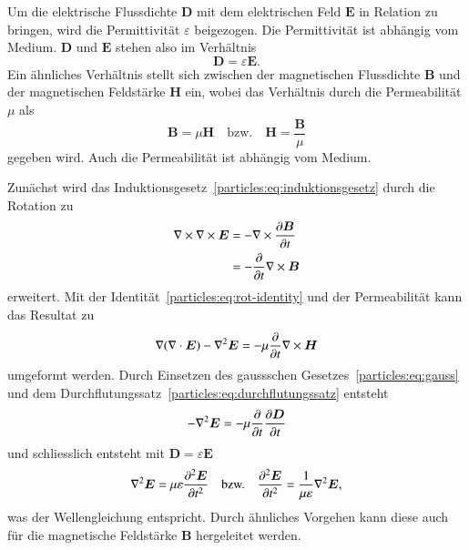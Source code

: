 Um die elektrische Flussdichte $\boldsymbol{D}$ mit dem elektrischen Feld $\boldsymbol{E}$ in Relation zu bringen, 
%
%
%
wird die Permittivität $\varepsilon$ beigezogen.
%
Die Permittivität ist abhängig vom Medium. 
$\boldsymbol{D}$ und $\boldsymbol{E}$ stehen also im Verhältnis
\begin{equation}
    \boldsymbol{D} = \varepsilon \boldsymbol{E}.
    \label{particles:eq:de}
\end{equation}
Ein ähnliches Verhältnis stellt sich zwischen der magnetischen Flussdichte $\boldsymbol{B}$ und der magnetischen Feldstärke $\boldsymbol{H}$ ein, wobei das Verhältnis durch die Permeabilität $\mu$ als
%
%
%
%
%
\begin{equation}
    \boldsymbol{B} = \mu \boldsymbol{H} \quad \text{bzw.} \quad \boldsymbol{H} = \frac{\boldsymbol{B}}{\mu}
    \label{particles:eq:bh}
\end{equation}
gegeben wird.
Auch die Permeabilität ist abhängig vom Medium.

Zunächst wird das Induktionsgesetz~\eqref{particles:eq:induktionsgesetz} durch die Rotation zu
\begin{align}
    \nabla \times \nabla \times \boldsymbol{E} 
        &= - \nabla \times \frac{\d\boldsymbol{B}}{\d t} \\
        &= - \frac{\d}{\d t} \nabla \times \boldsymbol{B}
\end{align}
erweitert.
Mit der Identität~\eqref{particles:eq:rot-identity} und der Permeabilität kann das Resultat zu
\[
    \nabla(\nabla \cdot \boldsymbol{E}) - \nabla^2 \boldsymbol{E} = -\mu \frac{\d}{\d t} \nabla \times \boldsymbol{H}
\]
umgeformt werden.
Durch Einsetzen des gaussschen Gesetzes~\eqref{particles:eq:gauss} und dem Durchflutungssatz~\eqref{particles:eq:durchflutungssatz} entsteht
\[
    - \nabla^2 \boldsymbol{E} = -\mu \frac{\d}{\d t} \frac{\d \boldsymbol{D}}{\d t}
\]
und schliesslich entsteht mit $\boldsymbol{D} = \varepsilon \boldsymbol{E}$
\[
    \nabla^2 \boldsymbol{E} = \mu\varepsilon \frac{\d^2 \boldsymbol{E}}{\d t^2} 
    \quad \text{bzw.} \quad
    \frac{\d^2 \boldsymbol{E}}{\d t^2} = \frac{1}{\mu \varepsilon} \nabla^2 \boldsymbol{E},
\]
was der Wellengleichung entspricht.
Durch ähnliches Vorgehen kann diese auch für die magnetische Feldstärke $\boldsymbol{B}$ hergeleitet werden.


